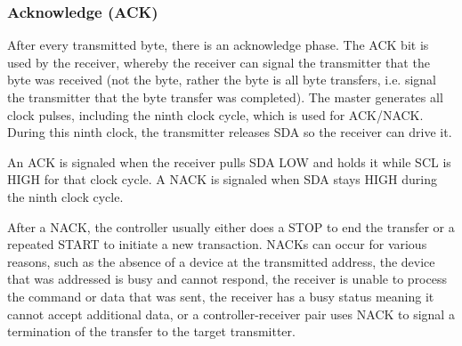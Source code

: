 \subsubsection{Acknowledge (ACK)}
\label{chap:Back_I2C_Protocol_ACK}

After every transmitted byte, there is an acknowledge phase. The ACK bit is 
used by the receiver, whereby the receiver can signal the transmitter that the byte 
was received (not the byte, rather the byte is all byte transfers, i.e. signal the 
transmitter that the byte transfer was completed). The master generates all clock 
pulses, including the ninth clock cycle, which is used for ACK/NACK. During this 
ninth clock, the transmitter releases SDA so the receiver can drive it. 

An ACK is signaled when the receiver pulls SDA LOW and holds it while SCL 
is HIGH for that clock cycle. A NACK is signaled when SDA stays HIGH during 
the ninth clock cycle. 

After a NACK, the controller usually either does a STOP to end the transfer 
or a repeated START to initiate a new transaction. NACKs can occur for various 
reasons, such as the absence of a device at the transmitted address, the device 
that was addressed is busy and cannot respond, the receiver is unable to process 
the command or data that was sent, the receiver has a busy status meaning it 
cannot accept additional data, or a controller-receiver pair uses NACK to signal a 
termination of the transfer to the target transmitter.